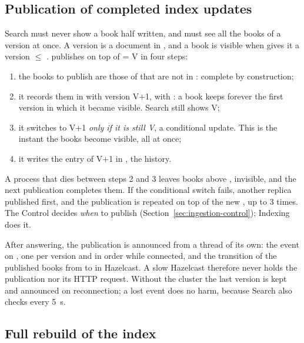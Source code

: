 \subsection{Publication of completed index updates}

Search must never show a book half written, and must see all the books of a version at once. A version is a document
 in , and a book is visible when  gives it a version $\le$
.  publishes on top of  = V in four steps:
\begin{enumerate}
  \item the books to publish are those of  that are not in : complete by
        construction;
  \item it records them in  with version V+1, with : a book keeps forever the
        first version in which it became visible. Search still shows V;
  \item it switches  to V+1 \emph{only if it is still V}, a conditional update. This is the instant the
        books become visible, all at once;
  \item it writes the entry of V+1 in , the history.
\end{enumerate}
A process that dies between steps 2 and 3 leaves books above , invisible, and the next publication
completes them. If the conditional switch fails, another replica published first, and the publication is repeated on
top of the new , up to 3 times. The Control decides \emph{when} to publish
(Section~\ref{sec:ingestion-control}); Indexing does it.

After answering, the publication is announced from a thread of its own: the  event on
, one per version and in order while connected, and the transition of the published books from
 to  in Hazelcast. A slow Hazelcast therefore never holds the publication nor its HTTP
request. Without the cluster the last version is kept and announced on reconnection; a lost event does no harm,
because Search also checks  every 5~s.

\subsection{Full rebuild of the index}

